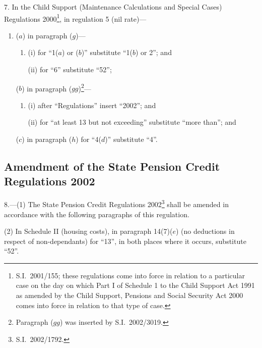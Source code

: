 \documentclass[12pt,a4paper]{article}
\begin{document}
7.  In the Child Support (Maintenance Calculations and Special Cases) Regulations 2000\footnote{S.I.\ 2001/155; these regulations come into force in relation to a particular case on the day on which Part I of Schedule 1 to the Child Support Act 1991 as amended by the Child Support, Pensions and Social Security Act 2000 comes into force in relation to that type of case.}, in regulation 5 (nil rate)—
\begin{enumerate}\item[]
($a$) in paragraph ($g$)—
\begin{enumerate}\item[]
(i) for “1($a$)  or ($b$)” substitute “1($b$)  or 2”; and

(ii) for “6” substitute “52”;
\end{enumerate}

($b$) in paragraph ($gg$)\footnote{Paragraph ($gg$)  was inserted by S.I.\ 2002/3019.}—
\begin{enumerate}\item[]
(i) after “Regulations” insert “2002”; and

(ii) for “at least 13 but not exceeding” substitute “more than”; and
\end{enumerate}

($c$) in paragraph ($h$)  for “4($d$)” substitute “4”.
\end{enumerate}

\subsection[8. Amendment of the State Pension Credit Regulations 2002]{Amendment of the State Pension Credit Regulations 2002}

8.---(1)  The State Pension Credit Regulations 2002\footnote{S.I.\ 2002/1792.} shall be amended in accordance with the following paragraphs of this regulation.

(2) In Schedule II (housing costs), in paragraph 14(7)($e$)  (no deductions in respect of non-dependants) for “13”, in both places where it occurs, substitute “52”.
\end{document}
